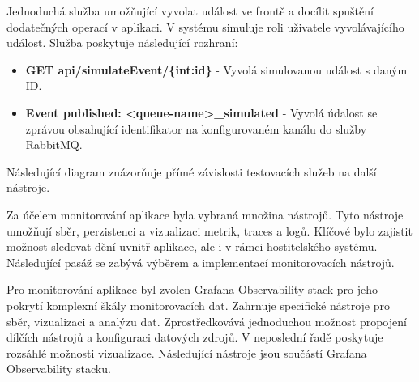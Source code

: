 
Jednoduchá služba umožňující vyvolat událost ve frontě a docílit spuštění dodatečných operací v aplikaci. V systému simuluje roli uživatele vyvolávajícího událost. Služba poskytuje následující rozhraní:

\begin{itemize}
    \item \textbf{GET api/simulateEvent/\{int:id\}} - Vyvolá simulovanou událost s daným ID.
    \item \textbf{Event published: <queue-name>\_simulated} - Vyvolá údalost se zprávou obsahující identifikator na konfigurovaném kanálu do služby RabbitMQ.
\end{itemize}

Následující diagram znázorňuje přímé závislosti testovacích služeb na další nástroje.



Za účelem monitorování aplikace byla vybraná množina nástrojů. Tyto nástroje umožňují sběr, perzistenci a vizualizaci metrik, traces a logů. Klíčové bylo zajistit možnost sledovat dění uvnitř aplikace, ale i v rámci hostitelského systému. Následující pasáž se zabývá výběrem a implementací monitorovacích nástrojů.


Pro monitorování aplikace byl zvolen Grafana Observability stack pro jeho pokrytí komplexní škály monitorovacích dat. Zahrnuje specifické nástroje pro sběr, vizualizaci a analýzu dat. Zprostředkovává jednoduchou možnost propojení dílčích nástrojů a konfiguraci datových zdrojů. V neposlední řadě poskytuje rozsáhlé možnosti vizualizace. Následující nástroje jsou součástí Grafana Observability stacku.

